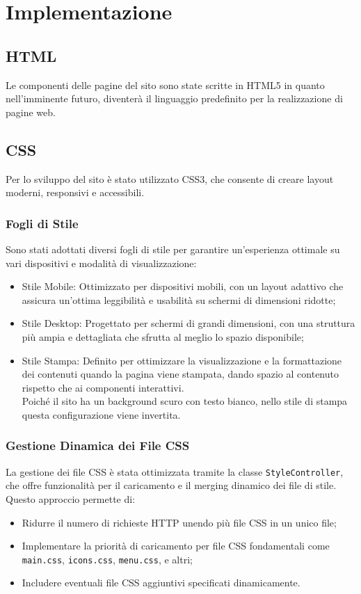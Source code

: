 \section{Implementazione}
\subsection{HTML}
Le componenti delle pagine del sito sono state scritte in HTML5 in quanto nell'imminente futuro, diventer\`a il linguaggio predefinito per la realizzazione di pagine web.

\subsection{CSS}
Per lo sviluppo del sito \`e stato utilizzato CSS3, che consente di creare layout moderni, responsivi e accessibili.
\subsubsection{Fogli di Stile}
Sono stati adottati diversi fogli di stile per garantire un’esperienza ottimale su vari dispositivi e modalità di visualizzazione:
\begin{itemize}
\item Stile Mobile: Ottimizzato per dispositivi mobili, con un layout adattivo che assicura un'ottima leggibilità e usabilità su schermi di dimensioni ridotte;
\item Stile Desktop: Progettato per schermi di grandi dimensioni, con una struttura più ampia e dettagliata che sfrutta al meglio lo spazio disponibile;
\item Stile Stampa: Definito per ottimizzare la visualizzazione e la formattazione dei contenuti quando la pagina viene stampata, dando spazio al contenuto rispetto che ai componenti interattivi.\\
Poiché il sito ha un background scuro con testo bianco, nello stile di stampa questa configurazione viene invertita.
\end{itemize}

\subsubsection{Gestione Dinamica dei File CSS}
La gestione dei file CSS \`e stata ottimizzata tramite la classe \texttt{StyleController}, che offre funzionalit\`a per il caricamento e il merging dinamico dei file di stile. Questo approccio permette di:
\begin{itemize}
\item Ridurre il numero di richieste HTTP unendo pi\`u file CSS in un unico file;
\item Implementare la priorit\`a di caricamento per file CSS fondamentali come \texttt{main.css}, \texttt{icons.css}, \texttt{menu.css}, e altri;
\item Includere eventuali file CSS aggiuntivi specificati dinamicamente.
\end{itemize}

